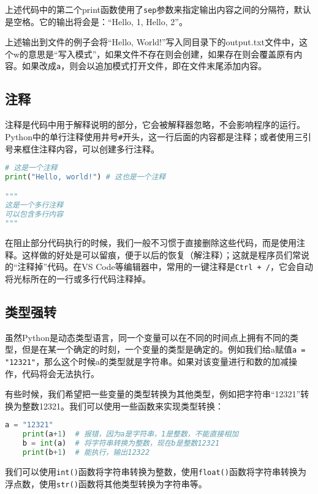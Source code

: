 \documentclass[../main.tex]{subfiles}
\begin{document}
上述代码中的第二个print函数使用了\texttt{sep}参数来指定输出内容之间的分隔符，默认是空格。它的输出将会是：“Hello, 1, Hello, 2”。

上述输出到文件的例子会将“Hello, World!”写入同目录下的output.txt文件中，这个w的意思是“写入模式”，如果文件不存在则会创建，如果存在则会覆盖原有内容。如果改成\texttt{a}，则会以追加模式打开文件，即在文件末尾添加内容。

\subsection{注释}

注释是代码中用于解释说明的部分，它会被解释器忽略，不会影响程序的运行。Python中的单行注释使用井号\texttt{\#}开头，这一行后面的内容都是注释；或者使用三引号来框住注释内容，可以创建多行注释。
\begin{lstlisting}[language=python]
# 这是一个注释
print("Hello, world!") # 这也是一个注释

"""
这是一个多行注释
可以包含多行内容
"""
\end{lstlisting}

在阻止部分代码执行的时候，我们一般不习惯于直接删除这些代码，而是使用注释。这样做的好处是可以留痕，便于以后的恢复（解注释）；这就是程序员们常说的“注释掉”代码。在VS Code等编辑器中，常用的一键注释是\texttt{Ctrl + /}，它会自动将光标所在的一行或多行代码注释掉。

\subsection{类型强转}

虽然Python是动态类型语言，同一个变量可以在不同的时间点上拥有不同的类型，但是在某一个确定的时刻，一个变量的类型是确定的。例如我们给a赋值\texttt{a = "12321"}，那么这个时候a的类型就是字符串。如果对该变量进行和数的加减操作，代码将会无法执行。

有些时候，我们希望把一些变量的类型转换为其他类型，例如把字符串“12321”转换为整数12321。我们可以使用一些函数来实现类型转换：

\begin{lstlisting}[language=python]
    a = "12321"
    print(a+1)  # 报错，因为a是字符串，1是整数，不能直接相加
    b = int(a)  # 将字符串转换为整数，现在b是整数12321
    print(b+1)  # 能执行，输出12322
\end{lstlisting}

我们可以使用\texttt{int()}函数将字符串转换为整数，使用\texttt{float()}函数将字符串转换为浮点数，使用\texttt{str()}函数将其他类型转换为字符串等。
\end{document}
